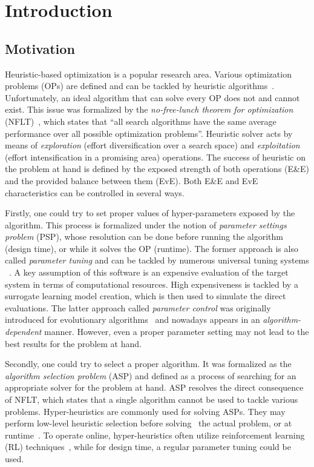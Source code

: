 \chapter{Introduction}\label{intro}

\section{Motivation}
Heuristic-based optimization is a popular research area. Various optimization problems (OPs) are defined and can be tackled by heuristic algorithms~\cite{junger2003combinatorial,biegler2004retrospective,festa2014brief}. Unfortunately, an ideal algorithm that can solve every OP does not and cannot exist. This issue was formalized by the \emph{no-free-lunch theorem for optimization} (NFLT)~\cite{wolpert1997no}, which states that ``all search algorithms have the same average performance over all possible optimization problems''. Heuristic solver acts by means of \emph{exploration} (effort diversification over a search space) and \emph{exploitation} (effort intensification in a promising area) operations. The success of heuristic on the problem at hand is defined by the exposed strength of both operations (E\&E) and the provided balance between them (EvE). Both E\&E and EvE characteristics can be controlled in several ways.

Firstly, one could try to set proper values of hyper-parameters exposed by the algorithm. This process is formalized under the notion of \emph{parameter settings problem} (PSP), whose resolution can be done before running the algorithm (design time), or while it solves the OP (runtime). The former approach is also called \emph{parameter tuning} and can be tackled by numerous universal tuning systems ~\cite{hutter2009paramils,hutter2011sequential,lopez2016irace,falkner2018bohb,brise2spl}. A key assumption of this software is an expensive evaluation of the target system in terms of computational resources. High expensiveness is tackled by a surrogate learning model creation, which is then used to simulate the direct evaluations. The latter approach called \emph{parameter control} was originally introduced for evolutionary algorithms~\cite{karafotias2014parameter} and nowadays appears in an \emph{algorithm-dependent} manner. However, even a proper parameter setting may not lead to the best results for the problem at hand. 

Secondly, one could try to select a proper algorithm. It was formalized as the \emph{algorithm selection problem} (ASP) and defined as a process of searching for an appropriate solver for the problem at hand. ASP resolves the direct consequence of NFLT, which states that a single algorithm cannot be used to tackle various problems. Hyper-heuristics are commonly used for solving ASPs. They may perform low-level heuristic selection before solving~\cite{burke2019classification} the actual problem, or at runtime~\cite{burke2019classification}. To operate online, hyper-heuristics often utilize reinforcement learning (RL) techniques~\cite{moriarty1999evolutionary,mcclymont2011markov}, while for design time, a regular parameter tuning could be used.

